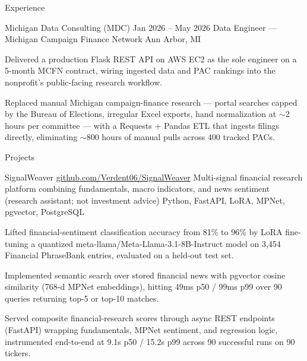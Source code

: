 \documentclass[
	11pt
]{../../../template}
\begin{document}
\begin{rSection}{E}{xperience}
		\begin{rSectionEntry}
			{Michigan Data Consulting (MDC)}
			{Jan 2026 -- May 2026}
			{Data Engineer --- Michigan Campaign Finance Network}
			{}
			{Ann Arbor, MI}

			\item Delivered a production Flask REST API on AWS EC2 as the sole engineer on a 5-month MCFN contract, wiring ingested data and PAC rankings into the nonprofit's public-facing research workflow.
			\item Replaced manual Michigan campaign-finance research --- portal searches capped by the Bureau of Elections, irregular Excel exports, hand normalization at $\sim$2 hours per committee --- with a Requests + Pandas ETL that ingests filings directly, eliminating $\sim$800 hours of manual pulls across 400 tracked PACs.
		\end{rSectionEntry}

	\end{rSection}

	\begin{rSection}{P}{rojects}
		\begin{rSectionEntry}
			{SignalWeaver}
			{\href{https://github.com/Verdent06/SignalWeaver}{github.com/Verdent06/SignalWeaver}}
			{Multi-signal financial research platform combining fundamentals, macro indicators, and news sentiment (research assistant; not investment advice)}
			{Python, FastAPI, LoRA, MPNet, pgvector, PostgreSQL}
			{}

			\item Lifted financial-sentiment classification accuracy from 81\% to 96\% by LoRA fine-tuning a quantized meta-llama/Meta-Llama-3.1-8B-Instruct model on 3,454 Financial PhraseBank entries, evaluated on a held-out test set.
			\item Implemented semantic search over stored financial news with pgvector cosine similarity (768-d MPNet embeddings), hitting 49ms p50 / 99ms p99 over 90 queries returning top-5 or top-10 matches.
			\item Served composite financial-research scores through async REST endpoints (FastAPI) wrapping fundamentals, MPNet sentiment, and regression logic, instrumented end-to-end at 9.1s p50 / 15.2s p99 across 90 successful runs on 90 tickers.
		\end{rSectionEntry}
	\end{rSection}
\end{document}
